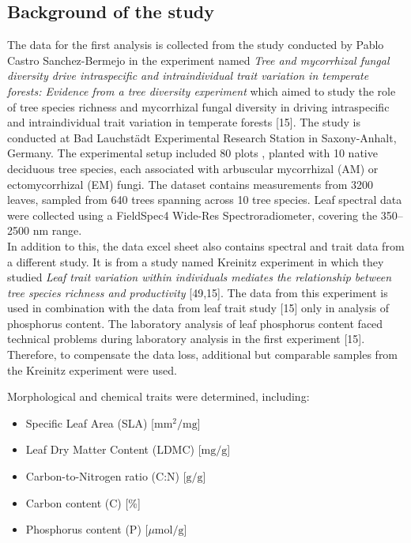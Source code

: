 \documentclass[12pt,a4paper]{report}
\begin{document}
\subsection*{Background of the study}
The data for the first analysis is collected from the study conducted by Pablo Castro Sanchez-Bermejo in the experiment named \textit{Tree and mycorrhizal fungal diversity drive intraspecific and intraindividual trait variation in temperate forests: Evidence from a tree diversity experiment} which aimed to study the role of tree species richness and mycorrhizal fungal diversity in driving intraspecific and intraindividual trait variation in temperate forests [15]. The study is conducted at Bad Lauchstädt Experimental Research Station in Saxony-Anhalt, Germany. The experimental setup included 80 plots , planted with 10 native deciduous tree species, each associated with arbuscular mycorrhizal (AM) or ectomycorrhizal (EM) fungi. The dataset contains measurements from 3200 leaves, sampled from 640 trees spanning across 10 tree species. Leaf spectral data were collected using a FieldSpec4 Wide-Res Spectroradiometer, covering the 350–2500 nm range. \\

In addition to this, the data excel sheet also contains spectral and trait data from a different study. It is from a study named Kreinitz experiment in which they studied \textit{Leaf trait variation within individuals mediates the relationship between tree species richness and productivity} [49,15]. The data from this experiment is used in combination with the data from leaf trait study [15] only in analysis of phosphorus content. The laboratory analysis of leaf phosphorus content faced technical problems during laboratory analysis in the first experiment [15]. Therefore, to compensate the data loss, additional but comparable samples from the Kreinitz experiment were used.


Morphological and chemical traits were determined, including:
\begin{itemize}
    \item Specific Leaf Area (SLA)  [$\text{mm}^2/\text{mg}$]
    \item Leaf Dry Matter Content (LDMC)  [$\text{mg}/\text{g}$]
    \item Carbon-to-Nitrogen ratio (C:N)  [$\text{g}/\text{g}$]
    \item Carbon content (C)  [\%]
    \item Phosphorus content (P) [$\mu\text{mol}/\text{g}$]
\end{itemize}
\end{document}
